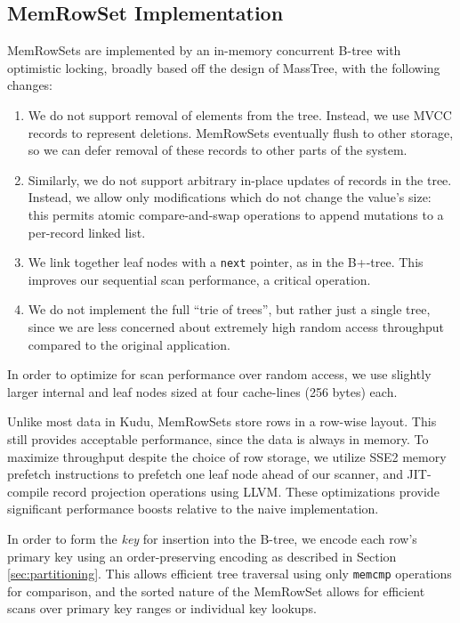 \documentclass[twocolumn,9pt]{article}
\begin{document}
\subsection{MemRowSet Implementation}

MemRowSets are implemented by an in-memory concurrent B-tree with optimistic
locking, broadly based off the design of MassTree\cite{masstree}, with the following
changes:
\begin{enumerate}
\item We do not support removal of elements from the tree. Instead, we use MVCC
  records to represent deletions. MemRowSets eventually flush to other storage,
  so we can defer removal of these records to other parts of the system.
\item Similarly, we do not support arbitrary in-place updates of records in the tree.
  Instead, we allow only modifications which do not change the value's size:
  this permits atomic compare-and-swap operations to append mutations to a
  per-record linked list.
\item We link together leaf nodes with a {\tt next} pointer, as in the B+-tree\cite{bplus_tree}.
  This improves our sequential scan performance, a critical operation.
\item We do not implement the full ``trie of trees'', but rather just a single
  tree, since we are less concerned about extremely high random access throughput
  compared to the original application.
\end{enumerate}

In order to optimize for scan performance over random access, we use slightly larger internal and
leaf nodes sized at four cache-lines (256 bytes) each.

Unlike most data in Kudu, MemRowSets store rows in a row-wise layout. This still
provides acceptable performance, since the data is always in memory. To maximize
throughput despite the choice of row storage, we utilize
SSE2 memory prefetch instructions to prefetch one leaf node ahead of our scanner,
and JIT-compile record projection operations using LLVM\cite{llvm}.
These optimizations provide significant performance boosts relative to the
naive implementation.

In order to form the {\em key} for insertion into the B-tree, we encode
each row's primary key using an order-preserving encoding as described in
Section \ref{sec:partitioning}. This allows efficient tree traversal using
only {\tt memcmp} operations for comparison, and the sorted nature of the
MemRowSet allows for efficient scans over primary key ranges or individual
key lookups.
\end{document}
